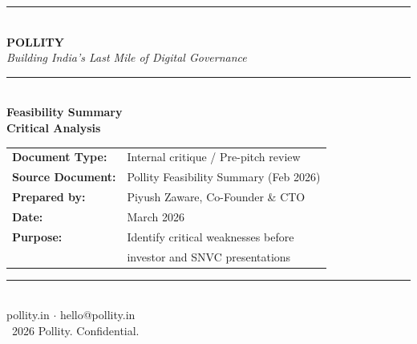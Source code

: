 \documentclass[12pt, a4paper]{article}
\begin{document}
\begin{titlepage}
    \centering
    \vspace*{2cm}

    {\color{pollityblue}\rule{\linewidth}{2pt}}\\[0.4cm]
    {\Huge\bfseries\color{pollityblue} POLLITY}\\[0.3cm]
    {\large\itshape Building India's Last Mile of Digital Governance}\\[0.2cm]
    {\color{pollityblue}\rule{\linewidth}{2pt}}\\[1.5cm]

    {\LARGE\bfseries Feasibility Summary\\[0.2cm]Critical Analysis}\\[1cm]

    \begin{tabular}{ll}
        \textbf{Document Type:} & Internal critique / Pre-pitch review \\[0.3em]
        \textbf{Source Document:} & Pollity Feasibility Summary (Feb 2026) \\[0.3em]
        \textbf{Prepared by:}    & Piyush Zaware, Co-Founder \& CTO \\[0.3em]
        \textbf{Date:}           & March 2026 \\[0.3em]
        \textbf{Purpose:}        & Identify critical weaknesses before \\
                                 & investor and SNVC presentations \\
    \end{tabular}

    \vfill

    {\color{midgray}\rule{\linewidth}{0.5pt}}\\[0.3cm]
    {\small pollity.in \quad $\cdot$ \quad hello@pollity.in}\\[0.2cm]
    {\small\textcopyright\ 2026 Pollity. Confidential.}
\end{titlepage}

\tableofcontents
\newpage

\end{document}
